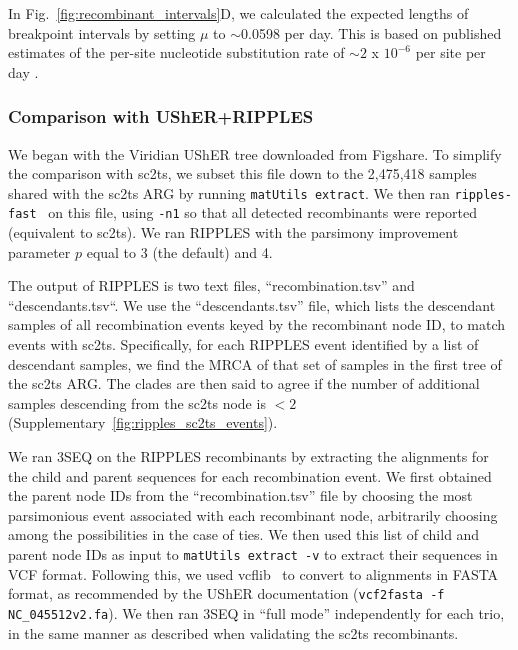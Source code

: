 \documentclass[12pt]{article}
\newcommand{\figref}[1]{Fig.~\ref{#1}}
\newcommand{\siref}[1]{Supplementary~\ref{#1}}
\begin{document}
In \figref{fig:recombinant_intervals}D,
we calculated the expected lengths of breakpoint intervals
by setting $\mu$ to $\sim$0.0598 per day.
This is based on published estimates of
the per-site nucleotide substitution rate of
$\sim2$ x $10^{-6}$ per site per day
\cite{Duchene2020,Ghafari2022,Markov2023}.

\subsubsection*{Comparison with UShER+RIPPLES}
We began with the Viridian UShER tree downloaded from Figshare.
To simplify the comparison with sc2ts, we subset this
file down to the 2,475,418 samples shared with the sc2ts ARG
by running \texttt{matUtils extract}.
We then ran \texttt{ripples-fast}~\cite{Smith2023tracking}
on this file, using \texttt{-n1} so that all detected
recombinants were reported (equivalent to sc2ts). We ran
RIPPLES with the parsimony improvement parameter $p$
equal to 3 (the default) and 4.

The output of RIPPLES is two text files, ``recombination.tsv''
and ``descendants.tsv``. We use the ``descendants.tsv'' file,
which lists the descendant samples of all recombination events
keyed by the recombinant node ID, to match events with sc2ts.
Specifically, for each RIPPLES event identified by a list of
descendant samples, we find the MRCA of
that set of samples in the first tree of the sc2ts ARG.
The clades are then said to agree if the number of additional
samples descending from the sc2ts node is $<2$
(\siref{fig:ripples_sc2ts_events}).

We ran 3SEQ on the RIPPLES recombinants by extracting the
alignments for the child and parent sequences for each
recombination event. We first obtained the parent
node IDs from the ``recombination.tsv'' file by choosing
the most parsimonious event associated with each recombinant
node,  arbitrarily choosing among the possibilities in
the case of ties. We then used this list of child and
parent node IDs as
input to \texttt{matUtils extract -v} to extract their
sequences in VCF format. Following this,
we used vcflib~\cite{Garrison2022spectrum} to convert
to alignments in FASTA format, as recommended by
the UShER documentation (\texttt{vcf2fasta -f NC\_045512v2.fa}).
We then ran 3SEQ in ``full mode''
independently for each trio, in the same manner as described
when validating the sc2ts recombinants.
\end{document}
